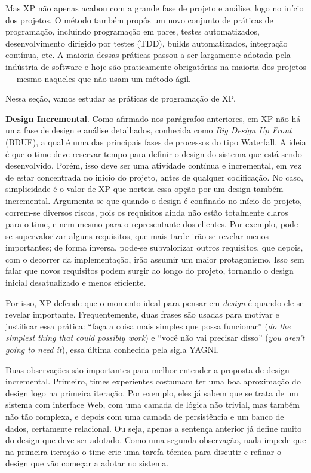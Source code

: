 \documentclass[
  11pt,
  twoside]{book}
\begin{document}
Mas XP não apenas acabou com a grande fase de projeto e análise, logo no
início dos projetos. O método também propôs um novo conjunto de práticas
de programação, incluindo programação em pares, testes automatizados,
desenvolvimento dirigido por testes (TDD), builds automatizados,
integração contínua, etc. A maioria dessas práticas passou a ser
largamente adotada pela indústria de software e hoje são praticamente
obrigatórias na maioria dos projetos --- mesmo naqueles que não usam um
método ágil.

Nessa seção, vamos estudar as práticas de programação de XP.

  \textbf{Design
Incremental}. Como afirmado nos parágrafos anteriores, em XP não há uma
fase de design e análise detalhados, conhecida como \emph{Big Design Up
Front} (BDUF), a qual é uma das principais fases de processos do tipo
Waterfall. A ideia é que o time deve reservar tempo para definir o
design do sistema que está sendo desenvolvido. Porém, isso deve ser uma
atividade contínua e incremental, em vez de estar concentrada no início
do projeto, antes de qualquer codificação. No caso, simplicidade é o
valor de XP que norteia essa opção por um design também incremental.
Argumenta-se que quando o design é confinado no início do projeto,
correm-se diversos riscos, pois os requisitos ainda não estão totalmente
claros para o time, e nem mesmo para o representante dos clientes. Por
exemplo, pode-se supervalorizar alguns requisitos, que mais tarde irão
se revelar menos importantes; de forma inversa, pode-se subvalorizar
outros requisitos, que depois, com o decorrer da implementação, irão
assumir um maior protagonismo. Isso sem falar que novos requisitos podem
surgir ao longo do projeto, tornando o design inicial desatualizado e
menos eficiente.

Por isso, XP defende que o momento ideal para pensar em \emph{design} é
quando ele se revelar importante. Frequentemente, duas frases são usadas
para motivar e justificar essa prática: ``faça a coisa mais simples que
possa funcionar'' (\emph{do the simplest thing that could possibly
work}) e ``você não vai precisar disso'' (\emph{you aren't going to need
it}), essa última conhecida pela sigla YAGNI.

Duas observações são importantes para melhor entender a proposta de
design incremental. Primeiro, times experientes costumam ter uma boa
aproximação do design logo na primeira iteração. Por exemplo, eles já
sabem que se trata de um sistema com interface Web, com uma camada de
lógica não trivial, mas também não tão complexa, e depois com uma camada
de persistência e um banco de dados, certamente relacional. Ou seja,
apenas a sentença anterior já define muito do design que deve ser
adotado. Como uma segunda observação, nada impede que na primeira
iteração o time crie uma tarefa técnica para discutir e refinar o design
que vão começar a adotar no sistema.
\end{document}
